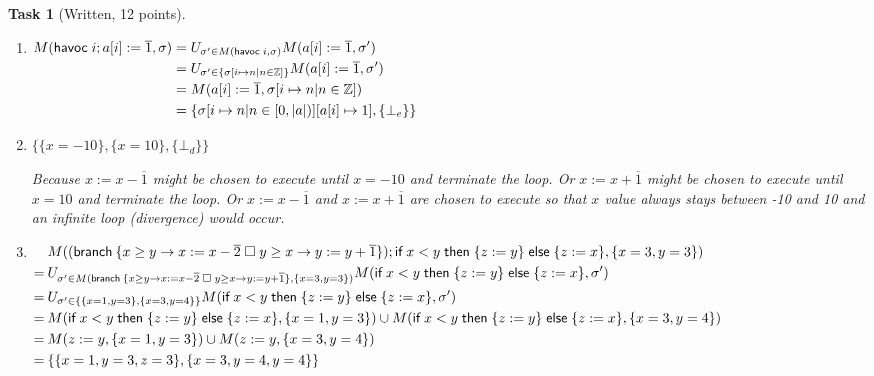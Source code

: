 \documentclass{article}
\newcommand{\z}{\mathbb{Z}}
\newcommand{\stmt}[1]{\text{\sffamily #1}}
\newcommand{\ifs}[3]{\stmt{if}\;#1\;\stmt{then}\;\{#2\}\;\stmt{else}\;\{#3\}}
\newcommand{\assign}[2]{#1 := #2}
\newcommand{\const}[1]{\overline{#1}}
\newcommand{\havoc}[1]{\ensuremath{\stmt{havoc}\; #1}}
\theoremstyle{task}
\newtheorem{task}{Task}[section]
\begin{document}
\begin{task}[Written, 12 points]\
    \begin{enumerate}
        \item
            $
            \!
            \begin{aligned}[t]
                M(\havoc{i}; \assign{a[i]}{\const{1}}, \sigma) &= U_{\sigma' \in M(\havoc{i}, \sigma)} M(\assign{a[i]}{\const{1}}, \sigma') \\
                                                               &= U_{\sigma' \in \{\sigma[i \mapsto n | n \in \z]\}} M(\assign{a[i]}{\const{1}}, \sigma') \\
                                                               &= M(\assign{a[i]}{\const{1}}, \sigma[i \mapsto n | n \in \z]) \\
                                                               &= \{\sigma[i \mapsto n | n \in [0, |a|)][a[i] \mapsto 1], \{\bot_e\}\}
            \end{aligned}
            $

        \item $\{\{x = -10\}, \{x = 10\}, \{\bot_d\}\}$

            Because $\assign{x}{x - \const{1}}$ might be chosen to execute until
            $x = -10$ and terminate the loop. Or $\assign{x}{x + \const{1}}$ might
            be chosen to execute until $x = 10$ and terminate the loop. Or
            $\assign{x}{x - \const{1}}$ and $\assign{x}{x + \const{1}}$ are
            chosen to execute so that $x$ value always stays between -10 and 10
            and an infinite loop (divergence) would occur.
        \item
            $
            \!
            \begin{aligned}[t]
                &M((\stmt{branch}\:\{x \geq y \rightarrow \assign{x}{x - \const{2}} \;\square\;
                y \geq x \rightarrow \assign{y}{y + \const{1}}\}); \ifs{x < y}{\assign{z}{y}}{\assign{z}{x}},
                \{x = 3, y = 3\}) \\
                =\:& U_{\sigma' \in M(\stmt{branch}\:\{x \geq y \rightarrow \assign{x}{x - \const{2}}
                \;\square\;y \geq x \rightarrow \assign{y}{y + \const{1}}\}, \{x = 3, y = 3\})}
                M(\ifs{x < y}{\assign{z}{y}}{\assign{z}{x}}, \sigma') \\
                =\:& U_{\sigma' \in \{\{x = 1, y = 3\}, \{x = 3, y = 4\}\}}
                M(\ifs{x < y}{\assign{z}{y}}{\assign{z}{x}}, \sigma') \\
                =\:& M(\ifs{x < y}{\assign{z}{y}}{\assign{z}{x}}, \{x = 1, y = 3\})
                \cup M(\ifs{x < y}{\assign{z}{y}}{\assign{z}{x}}, \{x = 3, y = 4\}) \\
                =\:& M(\assign{z}{y}, \{x = 1, y = 3\}) \cup M(\assign{z}{y}, \{x = 3, y = 4\}) \\
                =\:& \{\{x = 1, y = 3, z = 3\}, \{x = 3, y = 4, y = 4\}\}
            \end{aligned}
            $
    \end{enumerate}
\end{task}
\end{document}
